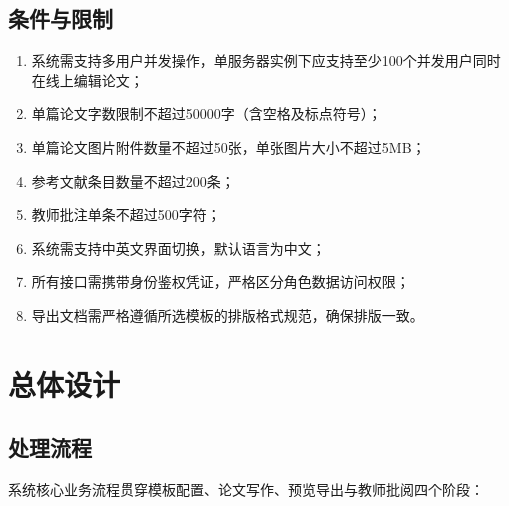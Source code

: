 \documentclass{../template/softeng}
\begin{document}
\subsection{条件与限制}
\begin{enumerate}
	\item 系统需支持多用户并发操作，单服务器实例下应支持至少100个并发用户同时在线上编辑论文；
	\item 单篇论文字数限制不超过50000字（含空格及标点符号）；
	\item 单篇论文图片附件数量不超过50张，单张图片大小不超过5MB；
	\item 参考文献条目数量不超过200条；
	\item 教师批注单条不超过500字符；
	\item 系统需支持中英文界面切换，默认语言为中文；
	\item 所有接口需携带身份鉴权凭证，严格区分角色数据访问权限；
	\item 导出文档需严格遵循所选模板的排版格式规范，确保排版一致。
\end{enumerate}


\section{总体设计}

\subsection{处理流程}

系统核心业务流程贯穿模板配置、论文写作、预览导出与教师批阅四个阶段：
\end{document}
